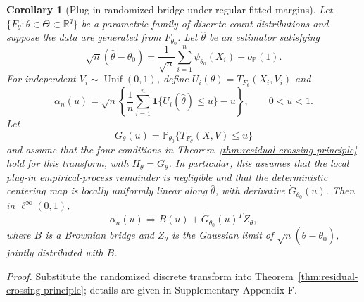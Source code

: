 \documentclass[preprint,12pt]{elsarticle}
\newcommand{\Prob}{\mathbb{P}}
\theoremstyle{plain}
\newtheorem{corollary}[theorem]{Corollary}
\theoremstyle{remark}
\begin{document}
\begin{corollary}[Plug-in randomized bridge under regular fitted margins]
\label{thm:randomized-plugin-bridge}
Let $\{F_\theta:\theta\in\Theta\subset\mathbb{R}^q\}$ be a parametric family
of discrete count distributions and suppose the data are generated from
$F_{\theta_0}$. Let $\widehat\theta$ be an estimator satisfying
\[
\sqrt n(\widehat\theta-\theta_0)
=\frac{1}{\sqrt n}\sum_{i=1}^n\psi_{\theta_0}(X_i)+o_{\mathbb P}(1).
\]
For independent $V_i\sim\operatorname{Unif}(0,1)$, define
$U_i(\theta)=T_{F_\theta}(X_i,V_i)$ and
\[
\alpha_n(u)=
\sqrt n\left\{
\frac{1}{n}\sum_{i=1}^n\mathbf 1\{U_i(\widehat\theta)\le u\}-u
\right\},\qquad 0<u<1.
\]
Let
\[
G_\theta(u)=\Prob_{\theta_0}\{T_{F_\theta}(X,V)\le u\}
\]
and assume that the four conditions in
Theorem~\ref{thm:residual-crossing-principle} hold for this transform, with
$H_\theta=G_\theta$. In particular, this assumes that the local plug-in
empirical-process remainder is negligible and that the deterministic centering
map is locally uniformly linear along $\widehat\theta$, with derivative
$\dot G_{\theta_0}(u)$. Then in
$\ell^\infty(0,1)$,
\[
\alpha_n(u)\Rightarrow B(u)+\dot G_{\theta_0}(u)^T Z_\theta,
\]
where $B$ is a Brownian bridge and $Z_\theta$ is the Gaussian limit of
$\sqrt n(\widehat\theta-\theta_0)$, jointly distributed with $B$.
\end{corollary}

\noindent\textit{Proof.} Substitute the randomized discrete transform into
Theorem~\ref{thm:residual-crossing-principle}; details are given in
Supplementary Appendix F.
\end{document}
